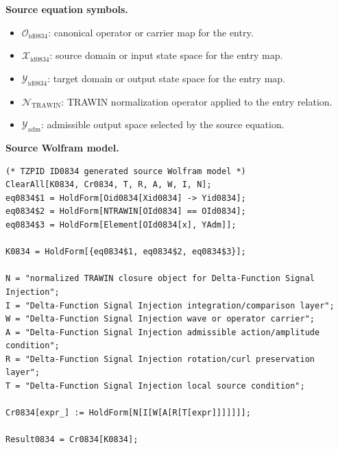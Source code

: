 \begin{minipage}[t]{0.49\linewidth}
\begingroup
\small
\raggedright
\textbf{Source equation symbols.}\par
\begin{itemize}[leftmargin=1.35em,itemsep=1pt,topsep=1pt,parsep=0pt]
    \item $\mathcal{O}_{\mathrm{id0834}}$: canonical operator or carrier map for the entry.
    \item $\mathcal{X}_{\mathrm{id0834}}$: source domain or input state space for the entry map.
    \item $\mathcal{Y}_{\mathrm{id0834}}$: target domain or output state space for the entry map.
    \item $\mathcal{N}_{\mathrm{TRAWIN}}$: TRAWIN normalization operator applied to the entry relation.
    \item $\mathcal{Y}_{\mathrm{adm}}$: admissible output space selected by the source equation.
\end{itemize}
\endgroup
\end{minipage}\hfill
\begin{minipage}[t]{0.47\linewidth}
\begingroup
\scriptsize
\raggedright
\textbf{Source Wolfram model.}\par
\begin{Verbatim}[fontsize=\tiny,breaklines=true,breakanywhere=true]
(* TZPID ID0834 generated source Wolfram model *)
ClearAll[K0834, Cr0834, T, R, A, W, I, N];
eq0834$1 = HoldForm[Oid0834[Xid0834] -> Yid0834];
eq0834$2 = HoldForm[NTRAWIN[OId0834] == OId0834];
eq0834$3 = HoldForm[Element[OId0834[x], YAdm]];

K0834 = HoldForm[{eq0834$1, eq0834$2, eq0834$3}];

N = "normalized TRAWIN closure object for Delta-Function Signal Injection";
I = "Delta-Function Signal Injection integration/comparison layer";
W = "Delta-Function Signal Injection wave or operator carrier";
A = "Delta-Function Signal Injection admissible action/amplitude condition";
R = "Delta-Function Signal Injection rotation/curl preservation layer";
T = "Delta-Function Signal Injection local source condition";

Cr0834[expr_] := HoldForm[N[I[W[A[R[T[expr]]]]]]];

Result0834 = Cr0834[K0834];
\end{Verbatim}
\endgroup
\end{minipage}

